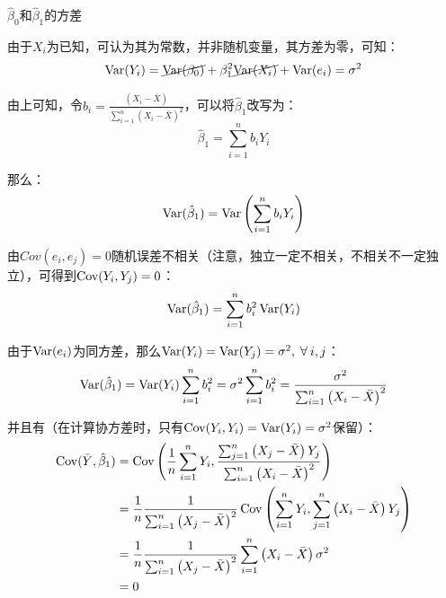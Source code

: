 \documentclass[11pt]{article}
\begin{document}
\begin{property}
    $\hat{\beta}_0$和$\hat{\beta}_1$的方差

    由于$X_i$为已知，可认为其为常数，并非随机变量，其方差为零，可知：
    \begin{equation*}
        \operatorname{Var}(Y_i) = \cancel{\operatorname{Var}(\beta_0)} + \beta_1^2 \cancel{\operatorname{Var}(X_i)} + \operatorname{Var}(e_i) = \sigma^2
    \end{equation*}

    由上可知，令$b_i = \frac{\left(X_i - \bar{X}\right)}{\sum_{i=1}^{n} \left(X_i - \bar{X}\right)^2}$，可以将$\hat{\beta}_1$改写为：
    \begin{equation*}
        \hat{\beta}_1 = \sum_{i=1}^{n} b_i Y_i
    \end{equation*}

    那么：
    \begin{equation*}
        \operatorname{Var}(\hat{\beta}_1) = \operatorname{Var}\left( \sum_{i=1}^{n} b_i Y_i \right)
    \end{equation*}

    由$Cov(e_i,e_j)=0$随机误差不相关（注意，独立一定不相关，不相关不一定独立），可得到$\operatorname{Cov}(Y_i,Y_j)=0$：
    \begin{equation*}
        \operatorname{Var}(\hat{\beta}_1) = \sum_{i=1}^{n} b_i^2 \operatorname{Var}(Y_i)
    \end{equation*}

    由于$\operatorname{Var}(e_i)$为同方差，那么$\Var(Y_i) = \Var(Y_j) = \sigma^2,\; \forall i,j$：
    \begin{equation*}
        \operatorname{Var}(\hat{\beta}_1)
        = \operatorname{Var}(Y_i) \sum_{i=1}^{n} b_i^2
        = \sigma^2 \sum_{i=1}^{n} b_i^2
        = \frac{\sigma^2}{\sum_{i=1}^{n} \left(X_i - \bar{X}\right)^2}
    \end{equation*}
    
    并且有（在计算协方差时，只有$\operatorname{Cov}(Y_i,Y_i)=\operatorname{Var}(Y_i)=\sigma^2$保留）：
    \begin{align*}
        \operatorname{Cov}(\bar{Y},\hat{\beta}_1)
        &= \operatorname{Cov} \left( \frac{1}{n} \sum_{i=1}^{n} Y_i, \frac{\sum_{j=1}^{n} \left(X_j - \bar{X}\right) Y_j}{\sum_{i=1}^{n} \left(X_i - \bar{X}\right)^2} \right) \\
        &= \frac{1}{n} \frac{1}{\sum_{i=1}^{n} \left(X_j - \bar{X}\right)^2} \operatorname{Cov} \left( \sum_{i=1}^{n} Y_i, \sum_{j=1}^{n} \left(X_i - \bar{X}\right) Y_j \right) \\
        &= \frac{1}{n} \frac{1}{\sum_{i=1}^{n} \left(X_j - \bar{X}\right)^2} \sum_{i=1}^{n} \left(X_i - \bar{X}\right) \sigma^2 \\
        &= 0
    \end{align*}


\end{property}
\end{document}
